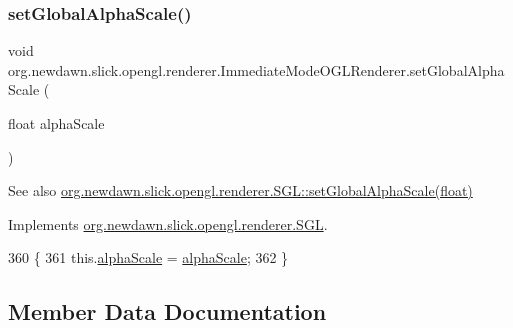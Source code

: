\subsubsection{\texorpdfstring{set\+Global\+Alpha\+Scale()}{setGlobalAlphaScale()}}
{\footnotesize\ttfamily void org.\+newdawn.\+slick.\+opengl.\+renderer.\+Immediate\+Mode\+O\+G\+L\+Renderer.\+set\+Global\+Alpha\+Scale (\begin{DoxyParamCaption}\item[{float}]{alpha\+Scale }\end{DoxyParamCaption})\hspace{0.3cm}{\ttfamily [inline]}}

\begin{DoxySeeAlso}{See also}
\mbox{\hyperlink{interfaceorg_1_1newdawn_1_1slick_1_1opengl_1_1renderer_1_1_s_g_l_a83549f052fb613b42b147eec5b04e079}{org.\+newdawn.\+slick.\+opengl.\+renderer.\+S\+G\+L\+::set\+Global\+Alpha\+Scale(float)}} 
\end{DoxySeeAlso}


Implements \mbox{\hyperlink{interfaceorg_1_1newdawn_1_1slick_1_1opengl_1_1renderer_1_1_s_g_l_a83549f052fb613b42b147eec5b04e079}{org.\+newdawn.\+slick.\+opengl.\+renderer.\+S\+GL}}.


\begin{DoxyCode}
360                                                       \{
361         this.\mbox{\hyperlink{classorg_1_1newdawn_1_1slick_1_1opengl_1_1renderer_1_1_immediate_mode_o_g_l_renderer_aa1772629fe3d1481ba6b0688fedcfb23}{alphaScale}} = \mbox{\hyperlink{classorg_1_1newdawn_1_1slick_1_1opengl_1_1renderer_1_1_immediate_mode_o_g_l_renderer_aa1772629fe3d1481ba6b0688fedcfb23}{alphaScale}};
362     \}
\end{DoxyCode}


\subsection{Member Data Documentation}
\mbox{\label{classorg_1_1newdawn_1_1slick_1_1opengl_1_1renderer_1_1_immediate_mode_o_g_l_renderer_aa1772629fe3d1481ba6b0688fedcfb23}} 
